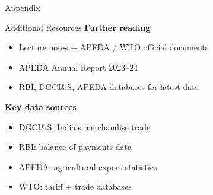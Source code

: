 \documentclass[
  ignorenonframetext,
  aspectratio=169,
]{beamer}
\makeatletter
\providecommand{\tightlist}{%
  \setlength{\itemsep}{0pt}\setlength{\parskip}{0pt}}
\let\quarto@originallabel\label
\DeclareRobustCommand*{\label}[1]{\quarto@originallabel{#1}}
\makeatother
\begin{document}
\begin{frame}{Appendix}
\label{appendix}
\begin{block}{Additional Resources}
\label{additional-resources}
\textbf{Further reading}

\begin{itemize}
\tightlist
\item
  Lecture notes + APEDA / WTO official documents
\item
  APEDA Annual Report 2023--24
\item
  RBI, DGCI\&S, APEDA databases for latest data
\end{itemize}

\textbf{Key data sources}

\begin{itemize}
\tightlist
\item
  DGCI\&S: India's merchandise trade
\item
  RBI: balance of payments data
\item
  APEDA: agricultural export statistics
\item
  WTO: tariff + trade databases
\end{itemize}
\end{block}
\end{frame}
\end{document}
